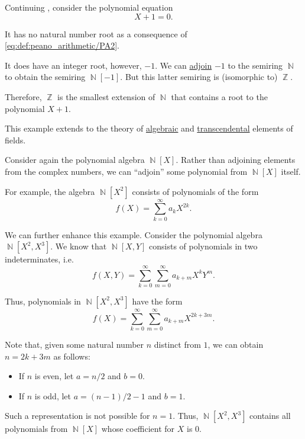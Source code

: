 \begin{example}\label{ex:adjoining_root}
  Continuing , consider the polynomial equation
  \begin{equation*}
    X + 1 = 0.
  \end{equation*}

  It has no natural number root as a consequence of \eqref{eq:def:peano_arithmetic/PA2}.

  It does have an integer root, however, \( -1 \). We can \hyperref[def:semiring_adjunction]{adjoin} \( -1 \) to the semiring \( \BbbN \) to obtain the semiring \( \BbbN[-1] \). But this latter semiring is (isomorphic to) \( \BbbZ \).

  Therefore, \( \BbbZ \) is the smallest extension of \( \BbbN \) that contains a root to the polynomial \( X + 1 \).

  This example extends to the theory of \hyperref[def:algebraic_element]{algebraic} and \hyperref[def:transcendental_element]{transcendental} elements of fields.
\end{example}

\begin{example}\label{ex:adjoining_polynomial}
  Consider again the polynomial algebra \( \BbbN[X] \). Rather than adjoining elements from the complex numbers, we can \enquote{adjoin} some polynomial from \( \BbbN[X] \) itself.

  For example, the algebra \( \BbbN[X^2] \) consists of polynomials of the form
  \begin{equation*}
    f(X) = \sum_{k=0}^\infty a_k X^{2k}.
  \end{equation*}

  We can further enhance this example. Consider the polynomial algebra \( \BbbN[X^2, X^3] \). We know that \( \BbbN[X, Y] \) consists of polynomials in two indeterminates, i.e.
  \begin{equation*}
    f(X, Y) = \sum_{k=0}^\infty \sum_{m=0}^\infty a_{k+m} X^k Y^m.
  \end{equation*}

  Thus, polynomials in \( \BbbN[X^2, X^3] \) have the form
  \begin{equation*}
    f(X) = \sum_{k=0}^\infty \sum_{m=0}^\infty a_{k+m} X^{2k + 3m}.
  \end{equation*}

  Note that, given some natural number \( n \) distinct from \( 1 \), we can obtain \( n = 2k + 3m \) as follows:
  \begin{itemize}
    \item If \( n \) is even, let \( a = n / 2 \) and \( b = 0 \).
    \item If \( n \) is odd, let \( a = (n - 1) / 2 - 1 \) and \( b = 1 \).
  \end{itemize}

  Such a representation is not possible for \( n = 1 \). Thus, \( \BbbN[X^2, X^3] \) contains all polynomials from \( \BbbN[X] \) whose coefficient for \( X \) is \( 0 \).
\end{example}

